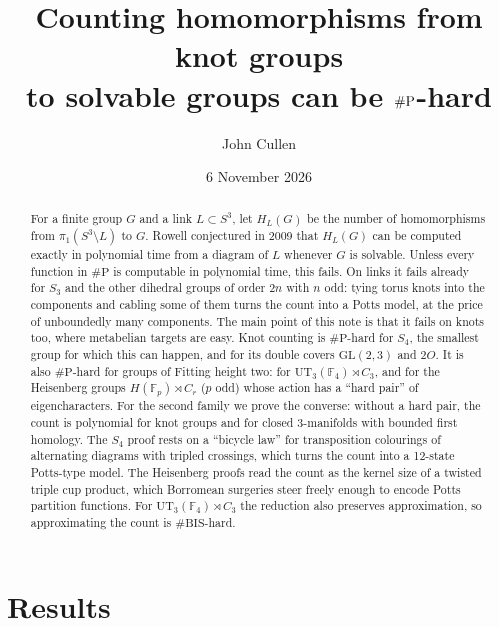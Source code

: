 \documentclass[11pt]{article}
\title{Counting homomorphisms from knot groups\\ to solvable groups can be $\sharpP$-hard}
\author{John Cullen}
\date{6 November 2026}
\theoremstyle{definition}
\theoremstyle{remark}
\newcommand{\F}{\mathbb{F}}
\newcommand{\sharpP}{\#\mathrm{P}}
\begin{document}
\maketitle
\begingroup\renewcommand{\thefootnote}{}\endgroup

\begin{abstract}
For a finite group $G$ and a link $L\subset S^3$, let $H_L(G)$ be the number of
homomorphisms from $\pi_1(S^3\setminus L)$ to $G$. Rowell conjectured in 2009
that $H_L(G)$ can be computed exactly in polynomial time from a diagram of $L$
whenever $G$ is solvable. Unless every function in $\sharpP$ is computable in
polynomial time, this fails. On links it fails already for $S_3$ and the other
dihedral groups of order $2n$ with $n$ odd: tying torus knots into the
components and cabling some of them turns the count into a Potts model, at the
price of unboundedly many components. The main point of this note is that it
fails on knots too, where metabelian targets are easy. Knot counting is
$\sharpP$-hard for $S_4$, the smallest group for which this can happen, and for
its double covers $\mathrm{GL}(2,3)$ and $2O$. It is also $\sharpP$-hard for
groups of Fitting height two: for $\mathrm{UT}_3(\F_4)\rtimes
C_3$, and for the Heisenberg groups $H(\F_p)\rtimes C_r$ ($p$ odd) whose
action has a ``hard pair'' of eigencharacters. For the second family we prove
the converse: without a hard pair, the count is polynomial for knot groups and
for closed 3-manifolds with bounded first homology. The $S_4$ proof rests on a
``bicycle law'' for transposition colourings of alternating diagrams with
tripled crossings, which turns the count into a 12-state Potts-type model. The
Heisenberg proofs read the count as the kernel size of a twisted triple cup
product, which Borromean surgeries steer freely enough to encode Potts
partition functions. For $\mathrm{UT}_3(\F_4)\rtimes C_3$ the reduction also
preserves approximation, so approximating the count is $\#\mathrm{BIS}$-hard.
\end{abstract}

\section{Results}
\end{document}
